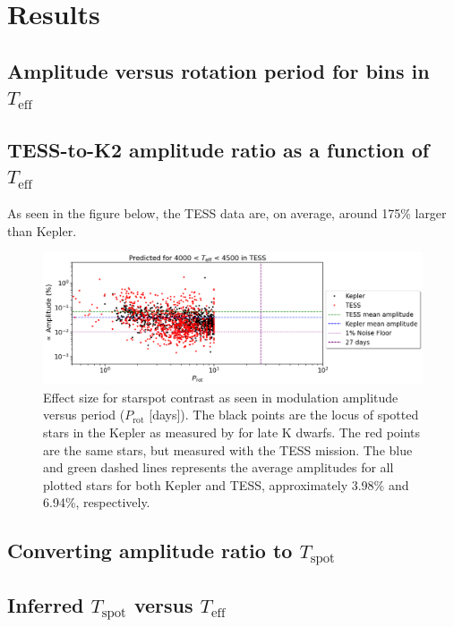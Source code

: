 \documentclass[modern]{aastex631}
\begin{document}
\section{Results}

\subsection{Amplitude versus rotation period for bins in $T_{\mathrm{eff}}$}

\subsection{TESS-to-K2 amplitude ratio as a function of $T_{\mathrm{eff}}$}

As seen in the figure below, the TESS data are, on average, around 175\% larger than Kepler.

\begin{figure}[!htb]
  \centering
  \includegraphics[scale=0.42]{Amplitude vs. Rotation for Kepler and TESS.png}
  \caption{Effect size for starspot contrast as seen in modulation amplitude versus period ($P_{\mathrm{rot}}$ [days]). The black points are the locus of spotted stars in the Kepler as measured by for late K dwarfs. The red points are the same stars, but measured with the TESS mission. The blue and green dashed lines represents the average amplitudes for all plotted stars for both Kepler and TESS, approximately 3.98\% and 6.94\%, respectively.}
\end{figure}
\FloatBarrier

\subsection{Converting amplitude ratio to $T_{\mathrm{spot}}$}

\subsection{Inferred $T_{\mathrm{spot}}$ versus $T_{\mathrm{eff}}$}
\end{document}
